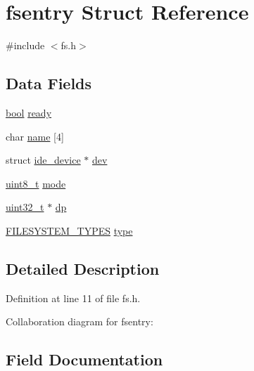\hypertarget{a00262}{}\section{fsentry Struct Reference}
\label{a00262}


{\ttfamily \#include $<$fs.\+h$>$}

\subsection*{Data Fields}
\begin{DoxyCompactItemize}
\item 
\hyperlink{a00134_af6a258d8f3ee5206d682d799316314b1_af6a258d8f3ee5206d682d799316314b1}{bool} \hyperlink{a00262_a284522ed97fe1eeebd0fcc039b2ea00a_a284522ed97fe1eeebd0fcc039b2ea00a}{ready}
\item 
char \hyperlink{a00262_a9c5a4f5b02eb2c9e9e797f79dc99028a_a9c5a4f5b02eb2c9e9e797f79dc99028a}{name} \mbox{[}4\mbox{]}
\item 
struct \hyperlink{a00214}{ide\+\_\+device} $\ast$ \hyperlink{a00262_aaea66ea744fa50f1c54666033884d8d2_aaea66ea744fa50f1c54666033884d8d2}{dev}
\item 
\hyperlink{a00134_aba7bc1797add20fe3efdf37ced1182c5_aba7bc1797add20fe3efdf37ced1182c5}{uint8\+\_\+t} \hyperlink{a00262_a6e71712bc3c51c21dc3362334937e4d7_a6e71712bc3c51c21dc3362334937e4d7}{mode}
\item 
\hyperlink{a00134_a435d1572bf3f880d55459d9805097f62_a435d1572bf3f880d55459d9805097f62}{uint32\+\_\+t} $\ast$ \hyperlink{a00262_ae1d22893563b8753e29fef01f0782ba5_ae1d22893563b8753e29fef01f0782ba5}{dp}
\item 
\hyperlink{a00155_a2e9d0c3765a28910638672bfc746181b_a2e9d0c3765a28910638672bfc746181b}{F\+I\+L\+E\+S\+Y\+S\+T\+E\+M\+\_\+\+T\+Y\+P\+ES} \hyperlink{a00262_acbab3dd44174c8f74e1d9305a13c7dbb_acbab3dd44174c8f74e1d9305a13c7dbb}{type}
\end{DoxyCompactItemize}


\subsection{Detailed Description}


Definition at line 11 of file fs.\+h.



Collaboration diagram for fsentry\+:


\subsection{Field Documentation}
\mbox{\label{a00262_aaea66ea744fa50f1c54666033884d8d2_aaea66ea744fa50f1c54666033884d8d2}} 
